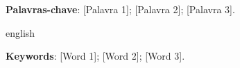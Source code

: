 
\setlength{\absparsep}{18pt}
\begin{resumo}


\vspace{\onelineskip}

\noindent
\textbf{Palavras-chave}: [Palavra 1]; [Palavra 2]; [Palavra 3].
\end{resumo}

\begin{resumo}[Abstract]
\begin{otherlanguage*}{english}


	\vspace{\onelineskip}

	\noindent
	\textbf{Keywords}: [Word 1]; [Word 2]; [Word 3].
\end{otherlanguage*}
\end{resumo}

